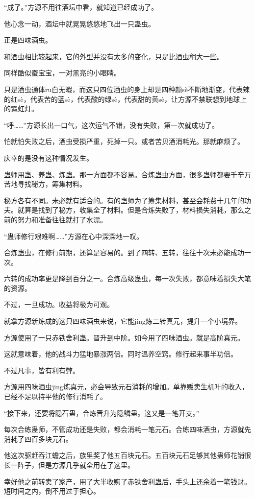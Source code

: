 \begin{this_body}
“成了。”方源不用往酒坛中看，就知道已经成功了。

他心念一动，酒坛中就晃晃悠悠地飞出一只蛊虫。

正是四味酒虫。

和酒虫相比较起来，它的外型并没有太多的变化，只是比酒虫稍大一些。

同样酷似蚕宝宝，一对黑亮的小眼睛。

只是酒虫通体ru白无暇，而这只四位酒虫的身上却是四种颜sè不断地渐变，代表辣的红sè，代表苦的蓝sè，代表酸的绿sè，代表甜的黄sè，让方源不禁联想到地球上的霓虹灯。

“呼……”方源长出一口气，这次运气不错，没有失败，第一次就成功了。

怕就怕失败之后，酒虫受损严重，死掉一只。或者苦贝酒消耗光。那就麻烦了。

庆幸的是没有这种情况发生。

蛊师用蛊、养蛊、炼蛊。那一方面都不容易。合炼蛊虫方面，很多蛊师都要千辛万苦地寻找秘方，筹集材料。

秘方各有不同。未必就有适合的。有的蛊师为了筹集材料，甚至会耗费十几年的功夫。就算是找到了秘方，收集全了材料。但是合炼失败了，材料损失消耗，那么之前的努力和准备往往就打了水漂。

“蛊师修行艰难啊……”方源在心中深深地一叹。

合炼蛊虫，在修行前期，还算是容易的。到了四转、五转，往往十次未必能成功一次。

六转的成功率更是降到百分之一。合炼高级蛊虫，每一次失败，都意味着损失大笔的资源。

不过，一旦成功。收益将极为可观。

就拿方源新炼成的这只四味酒虫来说，它能jing炼二转真元，提升一个小境界。

方源使用了一只赤铁舍利蛊。晋升到中阶。如今用了四味酒虫。就是高阶真元。

这就意味着，他的战斗力猛地暴涨两倍。同时温养空窍。修行起来事半功倍。

不过凡事，皆有利有弊。

方源用四味酒虫jing炼真元，必会导致元石消耗的增加。单靠贩卖生机叶的收入，已经不足以持平他的修行消耗了。

“接下来，还要将隐石蛊，合炼晋升为隐鳞蛊。这又是一笔开支。”

每次合练蛊师，不管成功还是失败，都会消耗一笔元石。合练四味酒虫，方源就先消耗了四百多块元石。

他这次驱赶吞江蟾之后，族里奖了他五百块元石。五百块元石足够其他蛊师花销很长一阵子，但是方源几乎就全用在了这里。

幸好他之前转卖了家产，用了大半收购了赤铁舍利蛊后，手头上还余着一笔钱财。短时间之内，倒不用过于担心。


\end{this_body}
